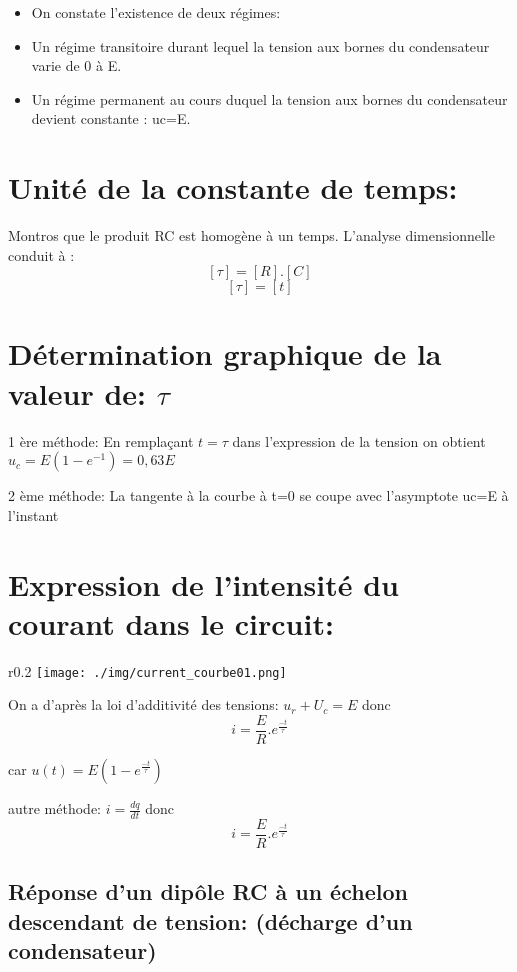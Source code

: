 \documentclass[12pt]{article}
\begin{document}
\begin{itemize}
	\item On constate l'existence de deux régimes:
	\item Un régime transitoire durant lequel la tension aux bornes du condensateur varie de 0 à E.
\item Un régime permanent au cours duquel la tension aux bornes du condensateur devient constante : uc=E.


\end{itemize}

\section*{Unité de la constante de temps:}
Montros que le produit RC est homogène à un temps. 
L’analyse dimensionnelle conduit à : $$[\tau] = [R].[C]$$
$$[\tau] = [t]$$


\section*{Détermination graphique de la valeur de: $\tau$}

1 ère méthode: En remplaçant $t=\tau$ dans l'expression de la tension on obtient $u_c = E(1-e^{-1}) = 0,63E$

2  ème méthode:
 La tangente à la courbe à t=0 se coupe avec l'asymptote uc=E à l'instant

 \section*{Expression de l'intensité du courant dans le circuit: }

\begin{wrapfigure}{r}{0.2\textwidth}
	\texttt{[image: ./img/current\_courbe01.png]}
\end{wrapfigure}


 On a d'après la loi d'additivité des tensions: $u_r + U_c =E$ donc $$i= \frac{E}{R}.e^{\frac{-t}{\tau}}$$

 car $u(t) = E(1-e^{\frac{-t}{\tau}})$

 autre méthode: $i = \frac{dq}{dt} $ donc $$i= \frac{E}{R}.e^{\frac{-t}{\tau}}$$



\subsection{Réponse d'un dipôle  RC à un échelon descendant de tension: (décharge d'un condensateur) }
\end{document}
